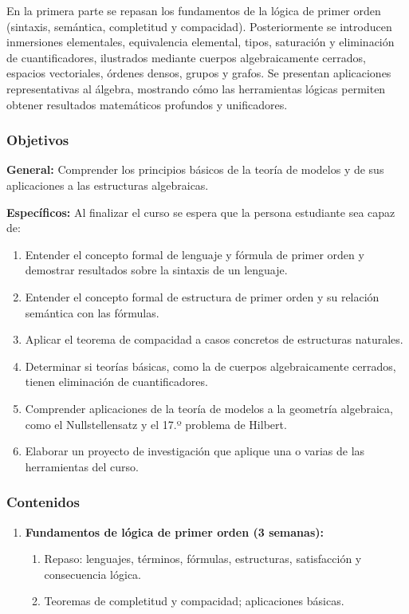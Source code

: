 \begin{refsection}
En la primera parte se repasan los fundamentos de la lógica de primer orden (sintaxis, semántica, completitud y compacidad). Posteriormente se introducen inmersiones elementales, equivalencia elemental, tipos, saturación y eliminación de cuantificadores, ilustrados mediante cuerpos algebraicamente cerrados, espacios vectoriales, órdenes densos, grupos y grafos. Se presentan aplicaciones representativas al álgebra, mostrando cómo las herramientas lógicas permiten obtener resultados matemáticos profundos y unificadores.

\subsubsection*{Objetivos}

\textbf{General:} Comprender los principios básicos de la teoría de modelos y de sus aplicaciones a las estructuras algebraicas.

\textbf{Específicos:} Al finalizar el curso se espera que la persona estudiante sea capaz de:

\begin{enumerate}
\item Entender el concepto formal de lenguaje y fórmula de primer orden y demostrar resultados sobre la sintaxis de un lenguaje.
\item Entender el concepto formal de estructura de primer orden y su relación semántica con las fórmulas.
\item Aplicar el teorema de compacidad a casos concretos de estructuras naturales.
\item Determinar si teorías básicas, como la de cuerpos algebraicamente cerrados, tienen eliminación de cuantificadores.
\item Comprender aplicaciones de la teoría de modelos a la geometría algebraica, como el Nullstellensatz y el 17.º problema de Hilbert.
\item Elaborar un proyecto de investigación que aplique una o varias de las herramientas del curso.
\end{enumerate}

\subsubsection*{Contenidos}

\begin{enumerate}

\item \textbf{Fundamentos de lógica de primer orden (3 semanas):}
\begin{enumerate}
    \item Repaso: lenguajes, términos, fórmulas, estructuras, satisfacción y consecuencia lógica.
    \item Teoremas de completitud y compacidad; aplicaciones básicas.
\end{enumerate}


\end{enumerate}
\end{refsection}
